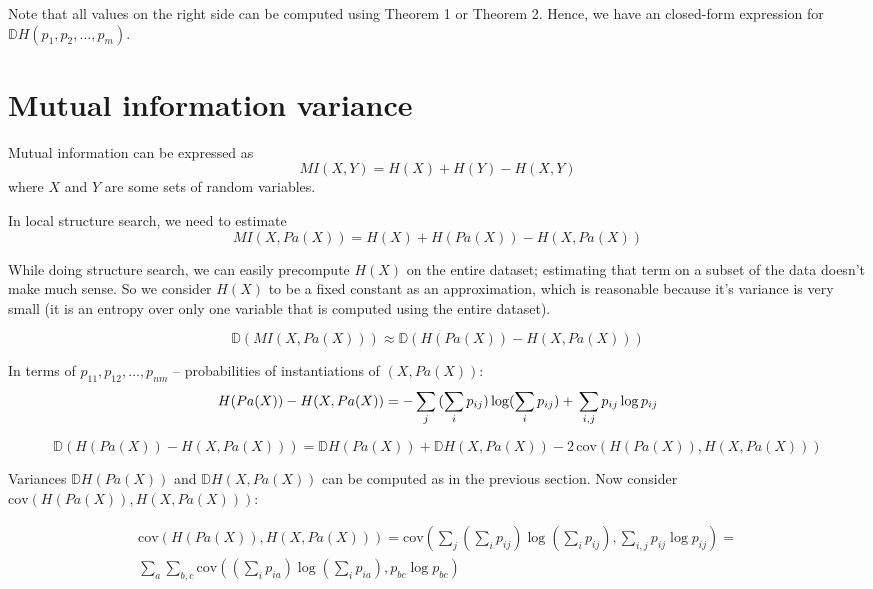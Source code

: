 \documentclass{article}
\begin{document}
Note that all values on the right side can be computed using Theorem 1 or Theorem 2. Hence, we have an closed-form expression for $\mathbb{D}H(p_1, p_2, \ldots, p_m)$.

\section{Mutual information variance}
Mutual information can be expressed as  
\begin{equation}
MI(X, Y) = H(X) + H(Y) - H(X, Y)
\end{equation}
where $X$ and $Y$ are some sets of random variables. 

In local structure search, we need to estimate
\begin{equation}
MI(X, Pa(X)) = H(X) + H(Pa(X)) - H(X, Pa(X))
\end{equation}

While doing structure search, we can easily precompute $H(X)$ on the entire dataset; estimating that term on a subset of the data doesn't make much sense. So we consider $H(X)$ to be a fixed constant as an approximation, which is reasonable because it's variance is very small (it is an entropy over only one variable that is computed using the entire dataset). 

\begin{equation*}
\mathbb{D}(MI(X, Pa(X))) \approx \mathbb{D}(H(Pa(X)) - H(X, Pa(X)))
\end{equation*}

In terms of $p_{11}, p_{12}, \ldots, p_{nm}$ -- probabilities of instantiations of $(X, Pa(X))$:
\begin{equation*}
H(Pa(X)) - H(X, Pa(X)) = -\sum_j{(\sum_i{p_{ij}}) \log(\sum_i{p_{ij}})} + \\ \sum_{i,j}{p_{ij} \log p_{ij}}
\end{equation*}

\begin{equation*}
\mathbb{D}(H(Pa(X)) - H(X, Pa(X))) = \mathbb{D}H(Pa(X)) + \mathbb{D}H(X, Pa(X)) - 2\,\mathrm{cov}(H(Pa(X)), H(X, Pa(X)))
\end{equation*}

Variances $\mathbb{D}H(Pa(X))$ and $\mathbb{D}H(X, Pa(X))$ can be computed as in the previous section. Now consider $\mathrm{cov}(H(Pa(X)), H(X, Pa(X)))$:

\begin{multline}
\mathrm{cov}(H(Pa(X)), H(X, Pa(X))) = \mathrm{cov}(\sum_j{(\sum_i{p_{ij}}) \log(\sum_i{p_{ij}})}, \sum_{i,j}{p_{ij} \log p_{ij}}) = 
\\ \sum_a \sum_{b,c} \mathrm{cov}((\sum_i{p_{ia}}) \log(\sum_i{p_{ia}}), p_{bc} \log p_{bc})
\end{multline}
\end{document}
